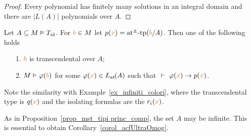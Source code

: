 \documentclass[creche.tex]{subfiles}
\begin{document}
\begin{proof}
Every polynomial has finitely many solutions in an integral domain and there are $|L(A)|$ polynomials over $A$.
\end{proof}



\begin{proposition}\label{prop_di_tipi princ_comp}
Let $A\subseteq M\models T_{\rm id}$. For ${\mr b}\in M$ let $p({\mr x})=\atpmtp({\mr b}/A)$. Then one of the following holds  
\begin{itemize}
\item[1.] ${\mr b}$ is transcendental over $A$;
\item[2.] $M\models\phi({\mr b})$ for some $\phi({\mr x})\in\atL(A)$ such that
$\ \proves\ \phi({\mr x})\imp p({\mr x})$.
\end{itemize}\end{proposition}

Note the similarity with Example~\ref{ex_infiniti_colori}, where the transcendental type is $q({\mr x})$ and the isolating formulas are the $r_i({\mr x})$. 

As in Proposition~\ref{prop_mst_tipi princ_comp}, the set $A$ may be infinite. This is essential to obtain Corollary~\ref{corol_acfUltraOmog}.
\end{document}

